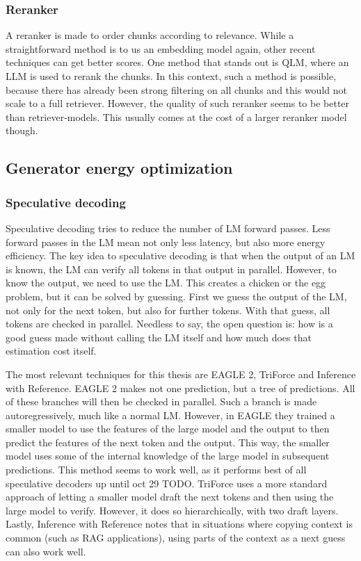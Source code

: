 \subsubsection{Reranker}
A reranker is made to order chunks according to relevance. While a straightforward method is to us an embedding model again, other recent techniques can get better scores. One method that stands out is QLM, where an LLM is used to rerank the chunks. In this context, such a method is possible, because there has already been strong filtering on all chunks and this would not scale to a full retriever. However, the quality of such reranker seems to be better than retriever-models. This usually comes at the cost of a larger reranker model though.


\subsection{Generator energy optimization}
\subsubsection{Speculative decoding}
Speculative decoding tries to reduce the number of LM forward passes. Less forward passes in the LM mean not only less latency, but also more energy efficiency. The key idea to speculative decoding is that when the output of an LM is known, the LM can verify all tokens in that output in parallel. However, to know the output, we need to use the LM. This creates a chicken or the egg problem, but it can be solved by guessing. First we guess the output of the LM, not only for the next token, but also for further tokens. With that guess, all tokens are checked in parallel. Needless to say, the open question is: how is a good guess made without calling the LM itself and how much does that estimation cost itself.

The most relevant techniques for this thesis are EAGLE 2, TriForce and Inference with Reference. EAGLE 2 makes not one prediction, but a tree of predictions. All of these branches will then be checked in parallel. Such a branch is made autoregressively, much like a normal LM. However, in EAGLE they trained a smaller model to use the features of the large model and the output to then predict the features of the next token and the output. This way, the smaller model uses some of the internal knowledge of the large model in subsequent predictions. This method seems to work well, as it performs best of all speculative decoders up until oct 29 TODO. TriForce uses a more standard approach of letting a smaller model draft the next tokens and then using the large model to verify. However, it does so hierarchically, with two draft layers. Lastly, Inference with Reference notes that in situations where copying context is common (such as RAG applications), using parts of the context as a next guess can also work well.
